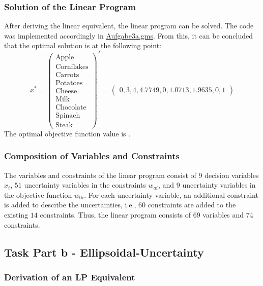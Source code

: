 \documentclass[a4paper,12pt]{article}
\begin{document}
\newpage

\subsubsection*{Solution of the Linear Program}

After deriving the linear equivalent, the linear program can be solved. The code was implemented accordingly in \href{../src/r3/Aufgabe3a.gms}{Aufgabe3a.gms}.
From this, it can be concluded that the optimal solution is at the following point:
\[
x^* = \begin{pmatrix}
    \text{Apple} \\ \text{Cornflakes} \\ \text{Carrots} \\ \text{Potatoes} \\ \text{Cheese} \\ \text{Milk} \\ \text{Chocolate} \\ \text{Spinach} \\ \text{Steak}
    \end{pmatrix}^T
     =
     \begin{pmatrix}
     0, 3, 4, 4.7749, 0, 1.0713, 1.9635, 0, 1
        \end{pmatrix}
\]
The optimal objective function value is .

\subsubsection*{Composition of Variables and Constraints} 

The variables and constraints of the linear program consist of $9$ decision variables $x_i$, $51$ uncertainty variables in the constraints $w_{ai}$, and $9$ uncertainty variables in the objective function $w_{0i}$.
For each uncertainty variable, an additional constraint is added to describe the uncertainties, i.e., $60$ constraints are added to the existing $14$ constraints.
Thus, the linear program consists of $69$ variables and $74$ constraints.

\newpage

\subsection*{Task Part b - Ellipsoidal-Uncertainty}

\subsubsection*{Derivation of an LP Equivalent}
\end{document}
